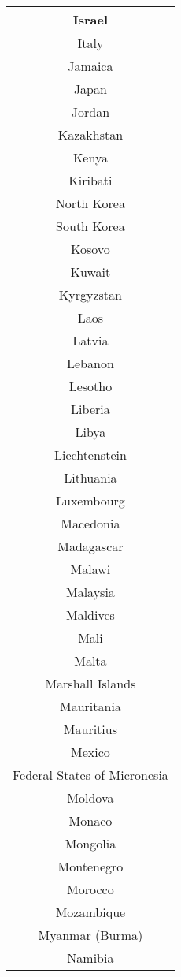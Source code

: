 \documentclass{article}
\begin{document}
\begin{center}
\begin{tabular} {|| c ||}
   Israel\\ \hline 
   Italy\\ \hline 
   Jamaica\\ \hline 
   Japan\\ \hline 
   Jordan\\ \hline 
   Kazakhstan\\ \hline 
   Kenya\\ \hline 
   Kiribati\\ \hline 
   North Korea\\ \hline 
   South Korea\\ \hline 
   Kosovo\\ \hline 
   Kuwait\\ \hline 
   Kyrgyzstan\\ \hline 
   Laos\\ \hline 
   Latvia\\ \hline 
   Lebanon\\ \hline 
   Lesotho\\ \hline 
   Liberia\\ \hline 
   Libya\\ \hline 
   Liechtenstein\\ \hline 
   Lithuania\\ \hline 
   Luxembourg\\ \hline 
   Macedonia\\ \hline 
   Madagascar\\ \hline 
   Malawi\\ \hline 
   Malaysia\\ \hline 
   Maldives\\ \hline 
   Mali\\ \hline 
   Malta\\ \hline 
   Marshall Islands\\ \hline 
   Mauritania\\ \hline 
   Mauritius\\ \hline 
   Mexico\\ \hline 
   Federal States of Micronesia\\ \hline 
   Moldova\\ \hline 
   Monaco\\ \hline 
   Mongolia\\ \hline 
   Montenegro\\ \hline 
   Morocco\\ \hline 
   Mozambique\\ \hline 
   Myanmar (Burma)\\ \hline 
   Namibia\\ \hline 

\end{tabular}
\end{center}
\end{document}
